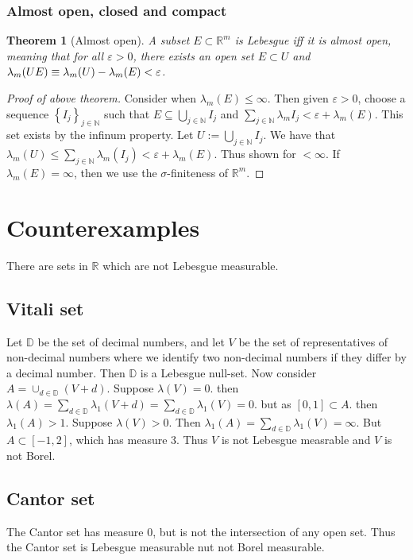 \documentclass{article}
\newtheorem{theorem}{Theorem}
\theoremstyle{definition}
\numberwithin{theorem}{section}
\numberwithin{equation}{section}
\begin{document}
\subsubsection{Almost open, closed and compact}
\begin{theorem}[Almost open]
	A subset $E \subset \mathbb{R}^m$ is Lebesgue iff it is almost open, meaning that for all $\varepsilon > 0$, there exists an open set $E \subset U$ and $\lambda_m(U\\E) \equiv \lambda_m(U) - \lambda_m(E) < \varepsilon$. 
\end{theorem}
\begin{proof}[Proof of above theorem]
	Consider when $\lambda_m(E) \leq \infty$. Then given $\varepsilon > 0$, choose a sequence $\left\lbrace I_j \right\rbrace_{j \in \mathbb{N}} $ such that $E \subseteq \bigcup_{j \in \mathbb{N}}I_j$ and $\sum_{j \in \mathbb{N}} \lambda_mI_j < \varepsilon + \lambda_m(E)$. This set exists by the infinum property.
	Let $U := \bigcup_{j \in \mathbb{N}}I_j$. We have that $\lambda_m(U) \leq \sum_{j \in \mathbb{N}}\lambda_m(I_j) < \varepsilon + \lambda_m(E)$. Thus shown for $< \infty$. If $\lambda_m(E) = \infty$, then we use the $\sigma$-finiteness of $\mathbb{R}^m$. 
\end{proof}

\section{Counterexamples}
There are sets in $\mathbb{R}$ which are not Lebesgue measurable.
\subsection{Vitali set}
Let $\mathbb{D}$ be the set of decimal numbers, and let $V$ be the set of representatives of non-decimal numbers where we identify two non-decimal numbers if they differ by a decimal number. Then $\mathbb{D}$ is a Lebesgue null-set. 
Now consider $A = \cup_{d \in \mathbb{D}}(V + d)$. Suppose $\lambda(V) = 0$. then $\lambda(A) = \sum_{d \in \mathbb{D}} \lambda_1(V + d) = \sum_{d \in \mathbb{D}} \lambda_1(V) = 0$. but as $[0, 1] \subset A$. then $\lambda_1(A) > 1$.
Suppose $\lambda(V) > 0$. Then $\lambda_1(A) =  \sum_{d \in \mathbb{D}} \lambda_1(V)  = \infty$. But $A \subset [-1, 2]$, which has measure 3. Thus $V$ is not Lebesgue measrable and $V$ is not Borel. 

\subsection{Cantor set}
The Cantor set has measure 0, but is not the intersection of any open set. Thus the Cantor set is Lebesgue measurable nut not Borel measurable. 
\end{document}
